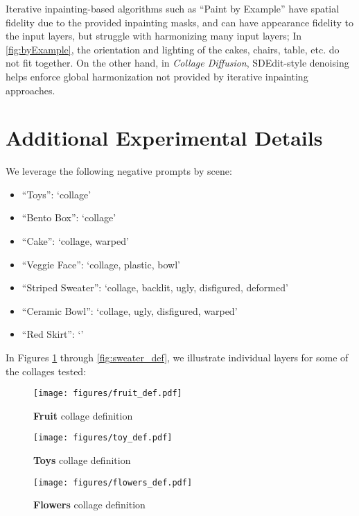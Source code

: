 Iterative inpainting-based algorithms such as ``Paint by Example''\cite{yang2023paint} have spatial fidelity due to the provided inpainting masks, and can have appearance fidelity to the input layers, but struggle with harmonizing many input layers; In \cref{fig:byExample}, the orientation and lighting of the cakes, chairs, table, etc. do not fit together. On the other hand, in \emph{Collage Diffusion}, SDEdit-style denoising helps enforce global harmonization not provided by iterative inpainting approaches.

\section{Additional Experimental Details}

We leverage the following negative prompts by scene:
\begin{itemize}
    \item ``Toys'': `collage'
    \item ``Bento Box'': `collage'
    \item ``Cake'': `collage, warped'
    \item ``Veggie Face'': `collage, plastic, bowl'
    \item ``Striped Sweater'': `collage, backlit, ugly, disfigured, deformed'
    \item ``Ceramic Bowl'': `collage, ugly, disfigured, warped'
    \item ``Red Skirt'': `'
\end{itemize}

\noindent In Figures \ref{fig:fruit_def} through \ref{fig:sweater_def}, we illustrate individual layers for some of the collages tested:

\begin{figure}[!htbp]
    \centering
    \texttt{[image: figures/fruit\_def.pdf]}
    \caption{\textbf{Fruit} collage definition}
    \label{fig:fruit_def}
\end{figure}

\begin{figure}[!htbp]
    \centering
    \texttt{[image: figures/toy\_def.pdf]}
    \caption{\textbf{Toys} collage definition}
    \label{fig:toy_def}
\end{figure}

\begin{figure}[!htbp]
    \centering
    \texttt{[image: figures/flowers\_def.pdf]}
    \caption{\textbf{Flowers} collage definition}
    \label{fig:bento_def}
\end{figure}


